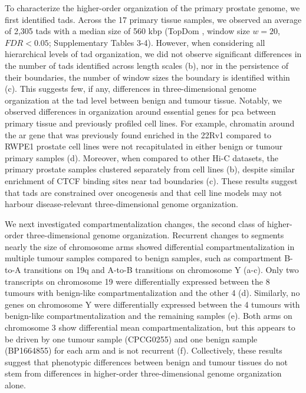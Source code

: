 To characterize the higher-order organization of the primary prostate genome, we first identified \glspl{tad}.
Across the 17 primary tissue samples, we observed an average of 2,305 \glspl{tad} with a median size of 560 kbp (TopDom \cite{shinTopDomEfficientDeterministic2016}, window size $w = 20$, $FDR < 0.05$; Supplementary Tables 3-4).
However, when considering all hierarchical levels of \gls{tad} organization, we did not observe significant differences in the number of \glspl{tad} identified across length scales (b), nor in the persistence of their boundaries, the number of window sizes the boundary is identified within (c).
This suggests few, if any, differences in three-dimensional genome organization at the \gls{tad} level between benign and tumour tissue.
Notably, we observed differences in organization around essential genes for \gls{pca} between primary tissue and previously profiled cell lines.
For example, chromatin around the \gls{ar} gene that was previously found enriched in the 22Rv1 compared to RWPE1 prostate cell lines \cite{rhieHighresolution3DEpigenomic2019} were not recapitulated in either benign or tumour primary samples (d).
Moreover, when compared to other Hi-C datasets, the primary prostate samples clustered separately from cell lines (b), despite similar enrichment of CTCF binding sites near \gls{tad} boundaries (c).
These results suggest that \glspl{tad} are constrained over oncogenesis and that cell line models may not harbour disease-relevant three-dimensional genome organization.

We next investigated compartmentalization changes, the second class of higher-order three-dimensional genome organization.
Recurrent changes to segments nearly the size of chromosome arms showed differential compartmentalization in multiple tumour samples compared to benign samples, such as compartment B-to-A transitions on 19q and A-to-B transitions on chromosome Y (a-c).
Only two transcripts on chromosome 19 were differentially expressed between the 8 tumours with benign-like compartmentalization and the other 4 (d).
Similarly, no genes on chromosome Y were differentially expressed between the 4 tumours with benign-like compartmentalization and the remaining samples (e).
Both arms on chromosome 3 show differential mean compartmentalization, but this appears to be driven by one tumour sample (CPCG0255) and one benign sample (BP1664855) for each arm and is not recurrent (f).
Collectively, these results suggest that phenotypic differences between benign and tumour tissues do not stem from differences in higher-order three-dimensional genome organization alone.

